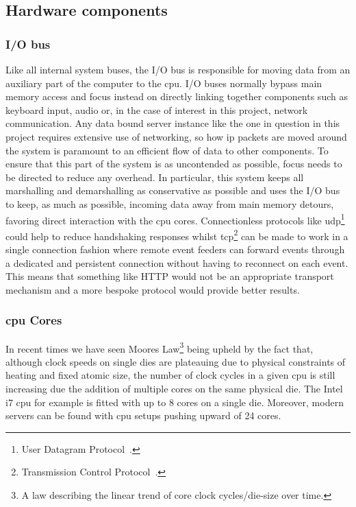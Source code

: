 \documentclass[a4paper,11pt]{scrreprt}
\begin{document}
\subsection{Hardware components}
\subsubsection{I/O bus}
Like all internal system buses, the I/O bus is responsible for moving data from an auxiliary part of the computer to the \acrshort{cpu}. I/O buses normally bypass main memory access and focus instead on directly linking together components such as keyboard input, audio or, in the case of interest in this project, network communication. Any data bound server instance like the one in question in this project requires extensive use of networking, so how \acrshort{ip} packets are moved around the system is paramount to an efficient flow of data to other components. To ensure that this part of the system is as uncontended as possible, focus needs to be directed to reduce any overhead. In particular, this system keeps all marshalling and demarshalling as conservative as possible and uses the I/O bus to keep, as much as possible, incoming data away from main memory detours, favoring direct interaction with the \acrshort{cpu} cores. Connectionless protocols like \acrshort{udp}\footnote{User Datagram Protocol~\cite{udp-rfc}.} could help to reduce handshaking responses whilst \acrshort{tcp}\footnote{Transmission Control Protocol~\cite{tcp-rfc}.} can be made to work in a single connection fashion where remote event feeders can forward events through a dedicated and persistent connection without having to reconnect on each event. This means that something like HTTP would not be an appropriate transport mechanism and a more bespoke protocol would provide better results.
\subsubsection{\acrshort{cpu} Cores}
In recent times we have seen Moores Law\footnote{A law describing the linear trend of core clock cycles/die-size over time.} being upheld by the fact that, although clock speeds on single dies are plateauing due to physical constraints of heating and fixed atomic size, the number of clock cycles in a given \acrshort{cpu} is still increasing due the addition of multiple cores on the same physical die. The Intel i7 \acrshort{cpu} for example is fitted with up to 8 cores on a single die. Moreover, modern servers can be found with \acrshort{cpu} setups pushing upward of 24 cores.
\end{document}
